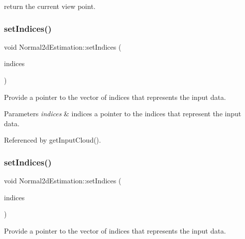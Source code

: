 return the current view point. 

\mbox{\label{classNormal2dEstimation_a91bb44f43f09aa33f3c447cfe2cde6b3}} 
\subsubsection{\texorpdfstring{set\+Indices()}{setIndices()}\hspace{0.1cm}{\footnotesize\ttfamily [1/2]}}
{\footnotesize\ttfamily void Normal2d\+Estimation\+::set\+Indices (\begin{DoxyParamCaption}\item[{const pcl\+::\+Point\+Indices\+::\+Ptr \&}]{indices }\end{DoxyParamCaption})}



Provide a pointer to the vector of indices that represents the input data. 


\begin{DoxyParams}{Parameters}
{\em indices} & indices a pointer to the indices that represent the input data. \\
\hline
\end{DoxyParams}


Referenced by get\+Input\+Cloud().

\mbox{\label{classNormal2dEstimation_a57a561d5d51d42584687dd4a3d29defd}} 
\subsubsection{\texorpdfstring{set\+Indices()}{setIndices()}\hspace{0.1cm}{\footnotesize\ttfamily [2/2]}}
{\footnotesize\ttfamily void Normal2d\+Estimation\+::set\+Indices (\begin{DoxyParamCaption}\item[{const pcl\+::\+Point\+Indices\+::\+Const\+Ptr \&}]{indices }\end{DoxyParamCaption})}



Provide a pointer to the vector of indices that represents the input data. 


